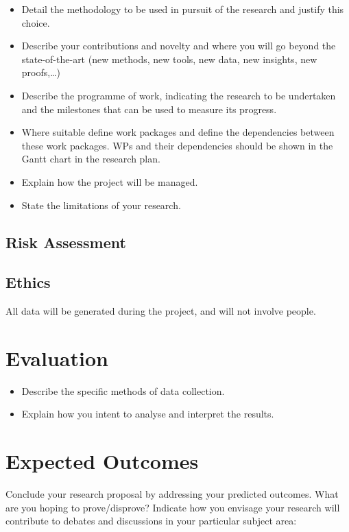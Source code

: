 \documentclass[a4paper,11pt]{article}
\begin{document}
\begin{itemize}
    \item Detail the methodology to be used in pursuit of the research and justify this choice.
    \item Describe your contributions and novelty and where you
    will go beyond the state-of-the-art (new methods, new tools,
    new data, new insights, new proofs,\ldots)
    \item Describe the programme of work, indicating the research to be undertaken and the milestones that can be used to measure its progress.
    \item Where suitable define work packages and define the dependencies
    between these work packages. WPs and their dependencies should be
    shown in the Gantt chart in the research plan.
    \item Explain how the project will be managed.
    \item State the limitations of your research.
\end{itemize}

\subsection{Risk Assessment}



\subsection{Ethics}

All data will be generated during the project, and will not involve people.

\section{Evaluation}



\begin{itemize}
    \item Describe the specific methods of data collection.
    \item Explain how you intent to analyse and interpret the results.
\end{itemize}

\section{Expected Outcomes}

Conclude your research proposal by addressing your predicted outcomes. What are you hoping to prove/disprove? Indicate how you envisage your research will contribute to debates and discussions in your particular subject area:
\end{document}
